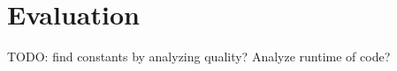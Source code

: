 \chapter{Evaluation}\label{chapter:Evaluation}

TODO: find constants by analyzing quality?
Analyze runtime of code? 

